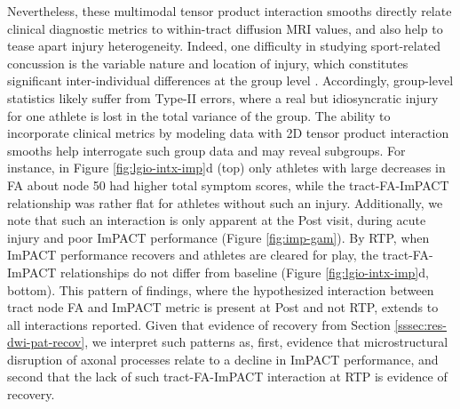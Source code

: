\documentclass[]{imag-ms-template}
\begin{document}
Nevertheless, these multimodal tensor product interaction smooths directly relate clinical diagnostic metrics to within-tract diffusion MRI values, and also help to tease apart injury heterogeneity. Indeed, one difficulty in studying sport-related concussion is the variable nature and location of injury, which constitutes significant inter-individual differences at the group level \parencite{lindsey2023DiffusionWeightedImagingMild}. Accordingly, group-level statistics likely suffer from Type-II errors, where a real but idiosyncratic injury for one athlete is lost in the total variance of the group. The ability to incorporate clinical metrics by modeling data with 2D tensor product interaction smooths help interrogate such group data and may reveal subgroups. For instance, in Figure \ref{fig:lgio-intx-imp}d (top) only athletes with large decreases in FA about node 50 had higher total symptom scores, while the tract-FA-ImPACT relationship was rather flat for athletes without such an injury. Additionally, we note that such an interaction is only apparent at the Post visit, during acute injury and poor ImPACT performance (Figure \ref{fig:imp-gam}). By RTP, when ImPACT performance recovers and athletes are cleared for play, the tract-FA-ImPACT relationships do not differ from baseline (Figure \ref{fig:lgio-intx-imp}d, bottom). This pattern of findings, where the hypothesized interaction between tract node FA and ImPACT metric is present at Post and not RTP, extends to all interactions reported. Given that evidence of recovery from Section \ref{sssec:res-dwi-pat-recov}, we interpret such patterns as, first, evidence that microstructural disruption of axonal processes relate to a decline in ImPACT performance, and second that the lack of such tract-FA-ImPACT interaction at RTP is evidence of recovery.
\end{document}
